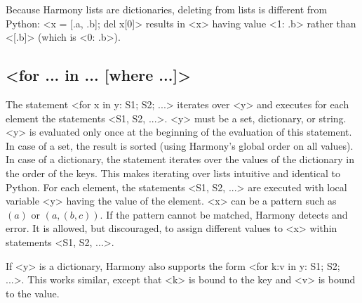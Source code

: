 \documentclass{report}
\begin{document}
Because Harmony lists are dictionaries, deleting from lists is different
from Python:
<{x = [.a, .b]; del x[0]}> results in <{x}> having value
<{{1: .b}}> rather than <{[.b]}> (which is <{{0: .b}}>).

\subsection*{<{for ... in ... [where ...]}>}

The statement <{for x in y: S1; S2; ...}>
iterates over <{y}> and executes for each element the statements
<{S1, S2, ...}>.
<{y}> must be a set, dictionary, or string.  <{y}> is evaluated only once at
the beginning of the evaluation of this statement.  In case of a set,
the result is sorted (using Harmony's global order on all values).
In case of a dictionary, the statement iterates over the values of
the dictionary in the order of the keys.  This makes iterating over
lists intuitive and identical to Python.
For each element, the statements <{S1, S2, ...}> are executed with
local variable <{y}> having the value of the element.
<{x}> can be a pattern such as $(a)$ or $(a, (b, c))$.
If the pattern cannot be matched, Harmony detects and error.
It is allowed, but discouraged, to assign different values to <{x}>
within statements <{S1, S2, ...}>.

If <{y}> is a dictionary, Harmony also supports the form
<{for k:v in y: S1; S2; ...}>.  This works similar,
except that <{k}> is bound to the key and <{v}> is bound to the value.
\end{document}
